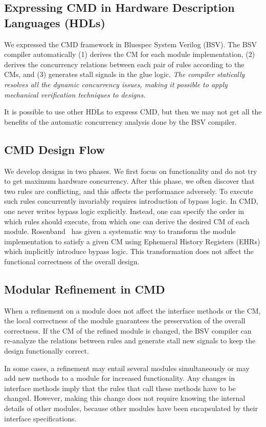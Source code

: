 \documentclass[conference]{IEEEtran}
\begin{document}
\subsection{Expressing CMD in Hardware Description Languages (HDLs)}
We expressed the CMD framework in Bluespec System Verilog (BSV).
The BSV compiler automatically (1) derives the CM for each module implementation, (2) derives the concurrency relations between each pair of rules according to the CMs, and (3) generates stall signals in the glue logic.
\emph{The compiler statically resolves all the dynamic concurrency issues, making it possible to apply mechanical verification  techniques to designs.}

It is possible to use other HDLs to express CMD, but then we may not get all the benefits of the automatic concurrency analysis done by the BSV compiler.

\subsection{CMD Design Flow}
We develop designs in two phases.
We first focus on functionality and do not try to get maximum hardware concurrency.
After this phase, we often discover that two rules are conflicting, and this affects the performance adversely.
To execute such rules concurrently invariably requires introduction of bypass logic.
In CMD, one never writes bypass logic explicitly.
Instead, one can specify the order in which rules should execute, from which one can derive the desired CM of each module.
Rosenband~\cite{rosenband2004ephemeral} has given a systematic way to transform the module implementation to satisfy a given CM using Ephemeral History Registers (EHRs) which implicitly introduce bypass logic.
This transformation does not affect the functional correctness of the overall design.

\subsection{Modular Refinement in CMD}
When a refinement on a module does not affect the interface methods or the CM, the local correctness of the module guarantees the preservation of the overall correctness.
If the CM of the refined module is changed, the BSV compiler can re-analyze the relations between rules and generate stall new signals to keep the design functionally correct.

In some cases, a refinement may entail several modules simultaneously or may add new methods to a module for increased functionality.
Any changes in interface methods imply that the rules that call these methods have to be changed.
However, making this change does not require knowing the internal details of other modules, because other modules have been encapsulated by their interface specifications.
\end{document}
